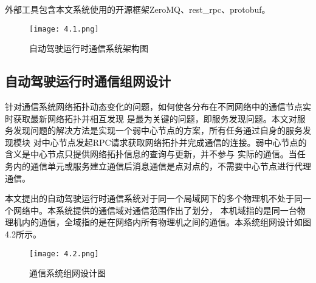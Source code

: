 外部工具包含本文系统使用的开源框架ZeroMQ、rest\_rpc、protobuf。

\begin{figure}[htb]
    \centering
    \texttt{[image: 4.1.png]}
    \caption{自动驾驶运行时通信系统架构图}
    \label{fig:35}
  \end{figure}

\subsection{自动驾驶运行时通信组网设计}
针对通信系统网络拓扑动态变化的问题，如何使各分布在不同网络中的通信节点实时获取最新网络拓扑并相互发现
是最为关键的问题，即服务发现问题。本文对服务发现问题的解决方法是实现一个弱中心节点的方案，所有任务通过自身的服务发现模块
对中心节点发起RPC请求获取网络拓扑并完成通信的连接。弱中心节点的含义是中心节点只提供网络拓扑信息的查询与更新，并不参与
实际的通信。当任务内的通信单元或服务建立通信后消息通信是点对点的，不需要中心节点进行代理通信。

本文提出的自动驾驶运行时通信系统对于同一个局域网下的多个物理机不处于同一个网络中。本系统提供的通信域对通信范围作出了划分，
本机域指的是同一台物理机内的通信，全域指的是在网络内所有物理机之间的通信。本系统组网设计如图4.2所示。

\begin{figure}[htb]
  \centering
  \texttt{[image: 4.2.png]}
  \caption{通信系统组网设计图}
  \label{fig:23}
\end{figure}

